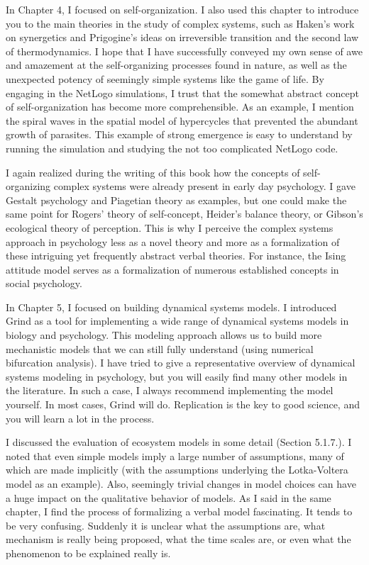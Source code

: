 \documentclass[
  letterpaper,
]{scrbook}
\begin{document}
In Chapter 4, I focused on self-organization. I also used this chapter
to introduce you to the main theories in the study of complex systems,
such as Haken's work on synergetics and Prigogine's ideas on
irreversible transition and the second law of thermodynamics. I hope
that I have successfully conveyed my own sense of awe and amazement at
the self-organizing processes found in nature, as well as the unexpected
potency of seemingly simple systems like the game of life. By engaging
in the NetLogo simulations, I trust that the somewhat abstract concept
of self-organization has become more comprehensible. As an example, I
mention the spiral waves in the spatial model of hypercycles that
prevented the abundant growth of parasites. This example of strong
emergence is easy to understand by running the simulation and studying
the not too complicated NetLogo code.

I again realized during the writing of this book how the concepts of
self-organizing complex systems were already present in early day
psychology. I gave Gestalt psychology and Piagetian theory as examples,
but one could make the same point for Rogers' theory of self-concept,
Heider's balance theory, or Gibson's ecological theory of perception.
This is why I perceive the complex systems approach in psychology less
as a novel theory and more as a formalization of these intriguing yet
frequently abstract verbal theories. For instance, the Ising attitude
model serves as a formalization of numerous established concepts in
social psychology.

In Chapter 5, I focused on building dynamical systems models. I
introduced Grind as a tool for implementing a wide range of dynamical
systems models in biology and psychology. This modeling approach allows
us to build more mechanistic models that we can still fully understand
(using numerical bifurcation analysis). I have tried to give a
representative overview of dynamical systems modeling in psychology, but
you will easily find many other models in the literature. In such a
case, I always recommend implementing the model yourself. In most cases,
Grind will do. Replication is the key to good science, and you will
learn a lot in the process.

I discussed the evaluation of ecosystem models in some detail (Section
5.1.7.). I noted that even simple models imply a large number of
assumptions, many of which are made implicitly (with the assumptions
underlying the Lotka-Voltera model as an example). Also, seemingly
trivial changes in model choices can have a huge impact on the
qualitative behavior of models. As I said in the same chapter, I find
the process of formalizing a verbal model fascinating. It tends to be
very confusing. Suddenly it is unclear what the assumptions are, what
mechanism is really being proposed, what the time scales are, or even
what the phenomenon to be explained really is.
\end{document}

